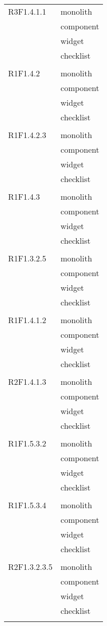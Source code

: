\begin{center}
\begin{longtable}{|p{7cm}|p{7cm}|}
		R3F1.4.1.1 & monolith \\ & component \\ & widget \\ & checklist \\ & \\ \hline
		R1F1.4.2 & monolith \\ & component \\ & widget \\ & checklist \\ & \\ \hline
		R1F1.4.2.3 & monolith \\ & component \\ & widget \\ & checklist \\ & \\ \hline
		R1F1.4.3 & monolith \\ & component \\ & widget \\ & checklist \\ & \\ \hline
		R1F1.3.2.5 & monolith \\ & component \\ & widget \\ & checklist \\ & \\ \hline
		R1F1.4.1.2 & monolith \\ & component \\ & widget \\ & checklist \\ & \\ \hline
		R2F1.4.1.3 & monolith \\ & component \\ & widget \\ & checklist \\ & \\ \hline
		R1F1.5.3.2 & monolith \\ & component \\ & widget \\ & checklist \\ & \\ \hline
		R1F1.5.3.4 & monolith \\ & component \\ & widget \\ & checklist \\ & \\ \hline
		R2F1.3.2.3.5 & monolith \\ & component \\ & widget \\ & checklist \\ & \\ \hline

\end{longtable}
\end{center}

